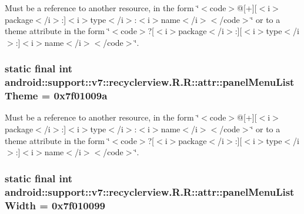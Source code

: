 Must be a reference to another resource, in the form \char`\"{}$<$code$>$@\mbox{[}+\mbox{]}\mbox{[}$<$i$>$package$<$/i$>$:\mbox{]}$<$i$>$type$<$/i$>$:$<$i$>$name$<$/i$>$$<$/code$>$\char`\"{} or to a theme attribute in the form \char`\"{}$<$code$>$?\mbox{[}$<$i$>$package$<$/i$>$:\mbox{]}\mbox{[}$<$i$>$type$<$/i$>$:\mbox{]}$<$i$>$name$<$/i$>$$<$/code$>$\char`\"{}. \hypertarget{classandroid_1_1support_1_1v7_1_1recyclerview_1_1_r_1_1attr_e7fb584b23058c7f0d668e96b5dbc33a}{
\subsubsection[{panelMenuListTheme}]{\setlength{\rightskip}{0pt plus 5cm}static final int android::support::v7::recyclerview.R.R::attr::panelMenuListTheme = 0x7f01009a}}
\label{classandroid_1_1support_1_1v7_1_1recyclerview_1_1_r_1_1attr_e7fb584b23058c7f0d668e96b5dbc33a}


Must be a reference to another resource, in the form \char`\"{}$<$code$>$@\mbox{[}+\mbox{]}\mbox{[}$<$i$>$package$<$/i$>$:\mbox{]}$<$i$>$type$<$/i$>$:$<$i$>$name$<$/i$>$$<$/code$>$\char`\"{} or to a theme attribute in the form \char`\"{}$<$code$>$?\mbox{[}$<$i$>$package$<$/i$>$:\mbox{]}\mbox{[}$<$i$>$type$<$/i$>$:\mbox{]}$<$i$>$name$<$/i$>$$<$/code$>$\char`\"{}. \hypertarget{classandroid_1_1support_1_1v7_1_1recyclerview_1_1_r_1_1attr_7b429a63253c6f1759a886914b22cca7}{
\subsubsection[{panelMenuListWidth}]{\setlength{\rightskip}{0pt plus 5cm}static final int android::support::v7::recyclerview.R.R::attr::panelMenuListWidth = 0x7f010099}}
\label{classandroid_1_1support_1_1v7_1_1recyclerview_1_1_r_1_1attr_7b429a63253c6f1759a886914b22cca7}


